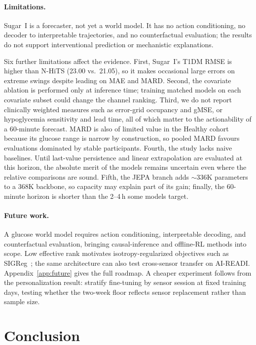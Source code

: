 \documentclass[11pt,a4paper]{article}
\begin{document}
\paragraph{Limitations.}
\label{sec:limitations}
Sugar~I is a forecaster, not yet a world model.
It has no action conditioning, no decoder to interpretable trajectories, and no counterfactual evaluation; the results do not support interventional prediction or mechanistic explanations.

Six further limitations affect the evidence.
First, Sugar~I's T1DM RMSE is higher than N-HiTS (23.00 vs.\ 21.05), so it makes occasional large errors on extreme swings despite leading on MAE and MARD.
Second, the covariate ablation is performed only at inference time; training matched models on each covariate subset could change the channel ranking.
Third, we do not report clinically weighted measures such as error-grid occupancy and gMSE, or hypoglycemia sensitivity and lead time, all of which matter to the actionability of a 60-minute forecast.
MARD is also of limited value in the Healthy cohort because its glucose range is narrow by construction, so pooled MARD favours evaluations dominated by stable participants.
Fourth, the study lacks naive baselines.
Until last-value persistence and linear extrapolation are evaluated at this horizon, the absolute merit of the models remains uncertain even where the relative comparisons are sound.
Fifth, the JEPA branch adds $\sim$336K parameters to a 368K backbone, so capacity may explain part of its gain; finally, the 60-minute horizon is shorter than the 2--4\,h some models target.

\paragraph{Future work.}
\label{sec:futurework}
A glucose world model requires action conditioning, interpretable decoding, and counterfactual evaluation, bringing causal-inference and offline-RL methods into scope.
Low effective rank motivates isotropy-regularized objectives such as SIGReg~\citep{balestriero2025lejepa}; the same architecture can also test cross-sensor transfer on AI-READI.
Appendix~\ref{app:future} gives the full roadmap.
A cheaper experiment follows from the personalization result: stratify fine-tuning by sensor session at fixed training days, testing whether the two-week floor reflects sensor replacement rather than sample size.

\section{Conclusion}
\end{document}
